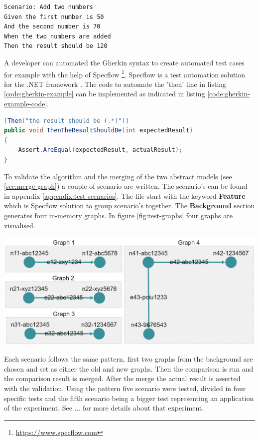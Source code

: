\begin{lstlisting}[language=Gherkin, caption=Calculator test example, label=code:gherkin-example]
Scenario: Add two numbers
Given the first number is 50
And the second number is 70
When the two numbers are added
Then the result should be 120
\end{lstlisting}

A developer can automated the Gherkin syntax to create automated test cases for example with the help of Specflow \footnote{\url{https://www.specflow.com}}. Specflow is a test automation solution for the .NET framework \cite{specflow}. The code to automate the 'then' line in listing \ref{code:gherkin-example} can be implemented as indicated in listing \ref{code:gherkin-example-code}.

\begin{lstlisting}[language=Java, caption=Implementation of a 'then' line, label=code:gherkin-example-code]
[Then("the result should be (.*)")]
public void ThenTheResultShouldBe(int expectedResult)
{
    Assert.AreEqual(expectedResult, actualResult);
}
\end{lstlisting}

To validate the algorithm and the merging of the two abstract models (see \ref{sec:merge-graph}) a couple of scenario are written. The scenario's can be found in appendix \ref{appendix:test-scenarios}. The file start with the keyword \textbf{Feature} which is Specflow solution to group scenario's together. The \textbf{Background} section generates four in-memory graphs. In figure \ref{fig:test-graphs} four graphs are visualised. 

\newpage
\begingroup
\captionsetup{type=figure}
\includegraphics[scale=0.6]{images/6-TestGraphs.png}
\label{fig:test-graphs}
\endgroup

Each scenario follows the same pattern, first two graphs from the background are chosen and set as either the old and new graphs. Then the comparison is run and the comparison result is merged. After the merge the actual result is asserted with the validation. Using the pattern five scenario were tested, divided in four specific tests and the fifth scenario being a bigger test representing an application of the experiment. See ... for more details about that experiment. 

